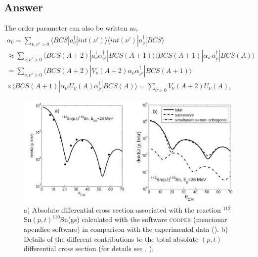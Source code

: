 \subsection*{Answer}
The order parameter can also be written as,
\begin{multline}
\alpha_0=\sum_{\nu,\nu'>0}\langle BCS |a^\dagger_{\nu}|int(\nu')\rangle\langle int(\nu')|a^\dagger_{\bar\nu}|BCS\rangle\\
\approx\sum_{\nu,\nu'>0}\langle BCS (A+2) |a^\dagger_{\nu}\alpha^\dagger_{\nu'}|BCS (A+1)\rangle\langle BCS (A+1)|\alpha_{\nu'}a^\dagger_{\bar\nu}|BCS (A)\rangle \\
=\sum_{\nu,\nu'>0}\langle BCS(A+2) |V_\nu(A+2)\alpha_{\bar\nu}\alpha^\dagger_{\nu'}|BCS(A+1)\rangle\\
\times\langle BCS(A+1)|\alpha_{\nu'}U_\nu(A)\alpha^\dagger_{\bar\nu}|BCS(A)\rangle
=\sum_{\nu>0}V_\nu(A+2)U_{\nu}(A),
\end{multline}
\begin{figure}
\centerline{\includegraphics*[width=\textwidth,angle=0]{nutshell/figs/fig2A2.pdf}}
\caption{a) Absolute differential cross section associated with the reaction $^{112}$Sn$(p,t)^{110}$Sn(gs) calculated with the software \textsc{cooper} (mencionar apendice software) in comparison with the experimental data (\cite{Guazzoni:06}). b) Details of the different contributions to the total absolute $(p,t)$ differential cross section (for details see \cite{Potel:13}, \cite{Potel:13b}).}\label{fig_2A2}
\end{figure}
